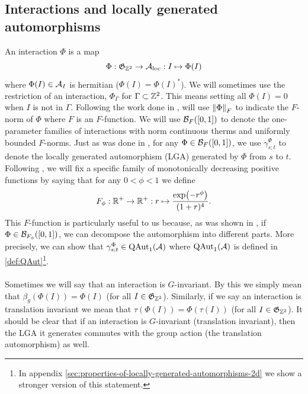\documentclass[11pt,a4paper,twoside]{article}
\numberwithin{equation}{section}
\begin{document}
	\subsection{Interactions and locally generated automorphisms}\label{sec:Interactions}
	An interaction $\Phi$ is a map
	\begin{equation}
		\Phi: \mathfrak{G}_{\ZZ^2}\rightarrow \AA_{\text{loc}}: I \mapsto \Phi(I)
	\end{equation}
	where $\Phi(I)\in\AA_I$ is hermitian ($\Phi(I)=\Phi(I)^*$). We will sometimes use the restriction of an interaction, $\Phi_\Gamma$ for $\Gamma\subset\ZZ^2$. This means setting all $\Phi(I)=0$ when $I$ is not in $\Gamma$. Following the work done in \cite{doi:10.1063/1.5095769}, will use $\norm{\Phi}_F$ to indicate the $F$-norm of $\Phi$ where $F$ is an $F$-function. We will use $\BB_{F}([0,1])$ to denote the one-parameter families of interactions with norm continuous therms and uniformly bounded $F$-norms. Just as was done in \cite{doi:10.1063/1.5095769}, for any $\Phi\in \BB_{F}([0,1])$, we use $\gamma^{\Phi}_{s;t}$ to denote the locally generated automorphism (LGA) generated by $\Phi$ from $s$ to $t$. Following \cite{ogata2021h3gmathbb}, we will fix a specific family of monotonically decreasing positive functions by saying that for any $0<\phi<1$ we define
	\begin{equation}\label{eq:OurFFunction}
		F_\phi:\RR^+\rightarrow\RR^+:r\mapsto \frac{\exp(-r^\phi)}{(1+r)^4}.
	\end{equation}
	This $F$-function is particularly useful to us because, as was shown in \cite{ogata2021h3gmathbb}, if $\Phi\in\BB_{F_\phi}([0,1])$, we can decompose the automorphism into different parts. More precisely, we can show that $\gamma^{\Phi}_{s;t}\in\QAut{\AA}$ where $\QAut{\AA}$ is defined in \ref{def:QAut}\footnote{In appendix \ref{sec:properties-of-locally-generated-automorphisms-2d} we show a stronger version of this statement.}.
	\\\\
	Sometimes we will say that an interaction is $G$-invariant. By this we simply mean that $\beta_g(\Phi(I))=\Phi(I)$ (for all $I\in\mathfrak{G}_{\ZZ^2}$). Similarly, if we say an interaction is translation invariant we mean that $\tau(\Phi(I))=\Phi(\tau(I))$ (for all $I\in\mathfrak{G}_{\ZZ^2}$). It should be clear that if an interaction is $G$-invariant (translation invariant), then the LGA it generates commutes with the group action (the translation automorphism) as well.
\end{document}
